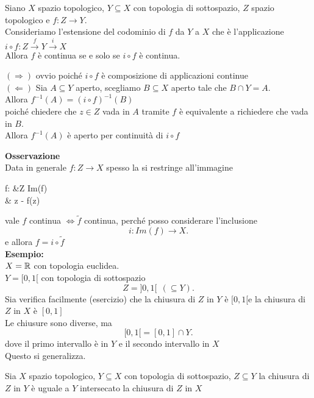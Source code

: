 \documentclass[12px]{article}
\begin{document}
	\begin{prop}
		Siano $X$ spazio topologico, $Y\subseteq X$ con topologia di sottospazio, $Z$ spazio topologico e $f : Z \rightarrow Y$.\\
		Consideriamo l'estensione del codominio di $f$ da $Y$ a $X$ che è l'applicazione  $i\circ f :Z\xrightarrow{f} Y \xrightarrow{i} X$\\
		Allora $f$ è continua se e solo se $i\circ f$ è continua.
	\end{prop}
	\begin{dimo}
		$ ( \Rightarrow )$ ovvio poiché $i\circ f$ è composizione di applicazioni continue\\
		$ ( \Leftarrow)$ Sia $A\subseteq Y$ aperto, scegliamo $B\subseteq X$ aperto tale che $B\cap Y = A$.\\
		Allora  $f^{-1}(A) = (i\circ f)^{-1}(B)$ \\
		poiché chiedere che $z\in Z$ vada in $A$ tramite $f$ è equivalente a richiedere che vada in $B$.\\
		Allora $f^{-1}(A)$ è aperto per continuità di $i\circ f$
	\end{dimo}
	\textbf{Osservazione}\\
	Data in generale $f: Z \rightarrow X$ spesso la si restringe all'immagine
	\begin{center}
		\begin{aligned}
			\tilde f: &Z \rightarrow Im(f)\\
				  & z - f(z)
		\end{aligned}
	\end{center}
	vale $f$ continua  $ \Leftrightarrow \tilde f$ continua, perché posso considerare l'inclusione 
	\[
	 i: Im(f) \rightarrow X
	.\]  
	e allora $f = i \circ \tilde f$\\
	 \textbf{Esempio:}\\
	 $X = \mathbb{R}$ con topologia euclidea.\\
	 $Y = [0,1[$ con topologia di sottospazio
	 \[
	  Z = ]0,1[ \ \ (\subseteq Y)
	 .\] 
	 Sia verifica facilmente (esercizio) che la chiusura di $Z$ in $Y$ è $[0,1[$e la chiusura di $Z$ in $X$ è $[0,1]$ \\
	 Le chiusure sono diverse, ma
	 \[
	  [0,1[ = [0,1]\cap Y
	 .\] 
	 dove il primo intervallo è in $Y$ e il secondo intervallo in $X$\\
	 Questo si generalizza.
	 \begin{lemm}
	 	Sia $X$ spazio topologico, $Y\subseteq X$ con topologia di sottospazio, $Z\subseteq Y$ la chiusura di $Z$ in $Y$ è uguale a $Y$ intersecato la chiusura di $Z$ in $X$
	 \end{lemm}
\end{document}
